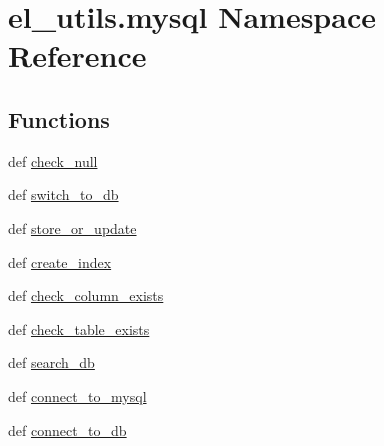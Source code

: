 \hypertarget{namespaceel__utils_1_1mysql}{\section{el\-\_\-utils.\-mysql Namespace Reference}
\label{namespaceel__utils_1_1mysql}
}
\subsection*{Functions}
\begin{DoxyCompactItemize}
\item 
def \hyperlink{namespaceel__utils_1_1mysql_ae8efa022d53eddcfd61d03befce99aed}{check\-\_\-null}
\item 
def \hyperlink{namespaceel__utils_1_1mysql_a395abdfcc75c08c3722fc5c099b8e363}{switch\-\_\-to\-\_\-db}
\item 
def \hyperlink{namespaceel__utils_1_1mysql_ad1dbce5e2a628225a3aee9f4bb002d4b}{store\-\_\-or\-\_\-update}
\item 
def \hyperlink{namespaceel__utils_1_1mysql_a6abb202a008324b7a7ebd93a090633c3}{create\-\_\-index}
\item 
def \hyperlink{namespaceel__utils_1_1mysql_a678d08047fe915fdfdb64fa7656a47d8}{check\-\_\-column\-\_\-exists}
\item 
def \hyperlink{namespaceel__utils_1_1mysql_ae851bd0e4c355de2c19970b2a79185b4}{check\-\_\-table\-\_\-exists}
\item 
def \hyperlink{namespaceel__utils_1_1mysql_afd4505f386ee5c9b602fad240a7f0dd3}{search\-\_\-db}
\item 
def \hyperlink{namespaceel__utils_1_1mysql_a5c03d901396e2eab57187bcd37d7ada8}{connect\-\_\-to\-\_\-mysql}
\item 
def \hyperlink{namespaceel__utils_1_1mysql_ab2866160e1729dedae21fb6b29d4463d}{connect\-\_\-to\-\_\-db}
\end{DoxyCompactItemize}


